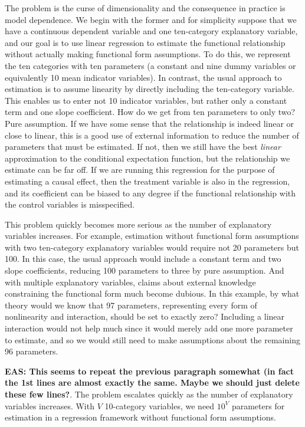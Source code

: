 \documentclass[11pt,titlepage]{article}
\begin{document}
The problem is the curse of dimensionality and the consequence in
practice is model dependence.  We begin with the former and for
simplicity suppose that we have a continuous dependent variable and
one ten-category explanatory variable, and our goal is to use linear
regression to estimate the functional relationship without actually
making functional form assumptions.  To do this, we represent the ten
categories with ten parameters (a constant and nine dummy variables or
equivalently 10 mean indicator variables).  In contrast, the usual
approach to estimation is to assume linearity by directly including
the ten-category variable.  This enables us to enter not 10 indicator
variables, but rather only a constant term and one slope coefficient.
How do we get from ten parameters to only two?  Pure assumption.  If
we have some sense that the relationship is indeed linear or close to
linear, this is a good use of external information to reduce the
number of parameters that must be estimated.  If not, then we still
have the best {\it linear} approximation to the conditional
expectation function, but the relationship we estimate can be far off.
If we are running this regression for the purpose of estimating a
causal effect, then the treatment variable is also in the regression,
and its coefficient can be biased to any degree if the functional
relationship with the control variables is misspecified.

This problem quickly becomes more serious as the number of explanatory
variables increases.  For example, estimation without functional form
assumptions with two ten-category explanatory variables would require
not 20 parameters but 100.  In this case, the usual approach would
include a constant term and two slope coefficients, reducing 100
parameters to three by pure assumption.  And with multiple explanatory
variables, claims about external knowledge constraining the functional
form much become dubious.  In this example, by what theory would we
know that 97 parameters, representing every form of nonlinearity and
interaction, should be set to exactly zero?  Including a linear
interaction would not help much since it would merely add one more
parameter to estimate, and so we would still need to make assumptions
about the remaining 96 parameters.

{\bf EAS:  This seems to repeat the previous paragraph somewhat (in fact the 1st lines
are almost exactly the same.  Maybe we should just delete these few lines?}.
The problem escalates quickly as the number of explanatory variables
increases.  With $V$ 10-category variables, we need $10^V$ parameters
for estimation in a regression framework without functional form
assumptions. %
\end{document}
